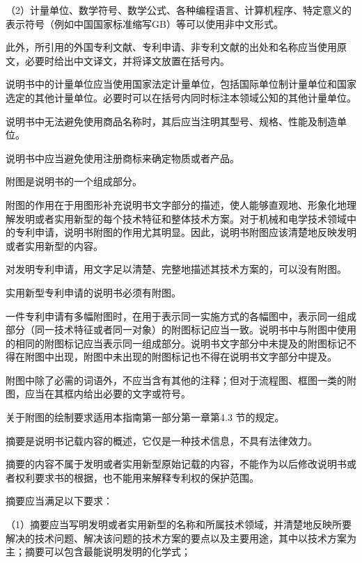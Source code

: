 {\setlength{\parindent}{17.1bp}（2）计量单位、数学符号、数学公式、各种编程语言、计算机程序、特定意义的表示符号（例如中国国家标准缩写GB）等可以使用非中文形式。\par}

此外，所引用的外国专利文献、专利申请、非专利文献的出处和名称应当使用原文，必要时给出中文译文，并将译文放置在括号内。

说明书中的计量单位应当使用国家法定计量单位，包括国际单位制计量单位和国家选定的其他计量单位。必要时可以在括号内同时标注本领域公知的其他计量单位。

说明书中无法避免使用商品名称时，其后应当注明其型号、规格、性能及制造单位。

说明书中应当避免使用注册商标来确定物质或者产品。

附图是说明书的一个组成部分。

附图的作用在于用图形补充说明书文字部分的描述，使人能够直观地、形象化地理解发明或者实用新型的每个技术特征和整体技术方案。对于机械和电学技术领域中的专利申请，说明书附图的作用尤其明显。因此，说明书附图应该清楚地反映发明或者实用新型的内容。

对发明专利申请，用文字足以清楚、完整地描述其技术方案的，可以没有附图。

实用新型专利申请的说明书必须有附图。

一件专利申请有多幅附图时，在用于表示同一实施方式的各幅图中，表示同一组成部分（同一技术特征或者同一对象）的附图标记应当一致。说明书中与附图中使用的相同的附图标记应当表示同一组成部分。说明书文字部分中未提及的附图标记不得在附图中出现，附图中未出现的附图标记也不得在说明书文字部分中提及。

附图中除了必需的词语外，不应当含有其他的注释；但对于流程图、框图一类的附图，应当在其框内给出必要的文字或符号。

关于附图的绘制要求适用本指南第一部分第一章第4.3 节的规定。

摘要是说明书记载内容的概述，它仅是一种技术信息，不具有法律效力。

摘要的内容不属于发明或者实用新型原始记载的内容，不能作为以后修改说明书或者权利要求书的根据，也不能用来解释专利权的保护范围。

摘要应当满足以下要求：

{\setlength{\parindent}{17.1bp}（1）摘要应当写明发明或者实用新型的名称和所属技术领域，并清楚地反映所要解决的技术问题、解决该问题的技术方案的要点以及主要用途，其中以技术方案为主；摘要可以包含最能说明发明的化学式；\par}

